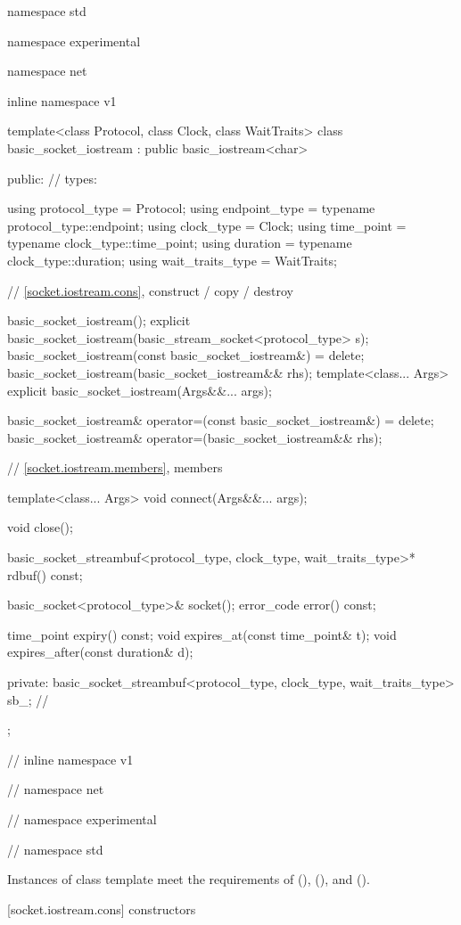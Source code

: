 \begin{codeblock}
namespace std {
namespace experimental {
namespace net {
inline namespace v1 {

  template<class Protocol, class Clock, class WaitTraits>
  class basic_socket_iostream : public basic_iostream<char>
  {
  public:
    // types:

    using protocol_type = Protocol;
    using endpoint_type = typename protocol_type::endpoint;
    using clock_type = Clock;
    using time_point = typename clock_type::time_point;
    using duration = typename clock_type::duration;
    using wait_traits_type = WaitTraits;

    // \ref{socket.iostream.cons}, construct / copy / destroy

    basic_socket_iostream();
    explicit basic_socket_iostream(basic_stream_socket<protocol_type> s);
    basic_socket_iostream(const basic_socket_iostream&) = delete;
    basic_socket_iostream(basic_socket_iostream&& rhs);
    template<class... Args>
      explicit basic_socket_iostream(Args&&... args);

    basic_socket_iostream& operator=(const basic_socket_iostream&) = delete;
    basic_socket_iostream& operator=(basic_socket_iostream&& rhs);

    // \ref{socket.iostream.members}, members

    template<class... Args> void connect(Args&&... args);

    void close();

    basic_socket_streambuf<protocol_type, clock_type, wait_traits_type>* rdbuf() const;

    basic_socket<protocol_type>& socket();
    error_code error() const;

    time_point expiry() const;
    void expires_at(const time_point& t);
    void expires_after(const duration& d);

  private:
    basic_socket_streambuf<protocol_type, clock_type, wait_traits_type> sb_; // \expos
  };

} // inline namespace v1
} // namespace net
} // namespace experimental
} // namespace std
\end{codeblock}

\pnum
Instances of class template  meet the requirements of  (),  (), and  ().


[socket.iostream.cons]{ constructors}


